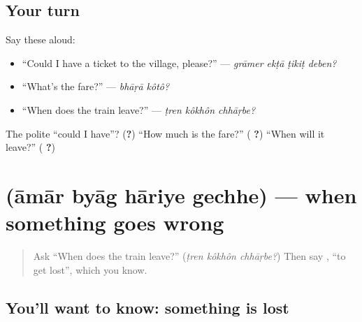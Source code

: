 \subsection*{Your turn}
Say these aloud:

\begin{itemize}
\raggedright
  \item \textquotedblleft{}Could I have a ticket to the village, please?\textquotedblright{} — \emph{grāmer ekṭā ṭikiṭ deben?}
  \item \textquotedblleft{}What's the fare?\textquotedblright{} — \emph{bhāṛā kôtô?}
  \item \textquotedblleft{}When does the train leave?\textquotedblright{} — \emph{ṭren kôkhôn chhāṛbe?}
\end{itemize}

\begin{tcolorbox}[breakable,colback=teal!4,colframe=teal!35!black,title={Before you move on}]
The polite \textquotedblleft{}could I have\textquotedblright{}? (\textbf{?}) \textquotedblleft{}How much is the fare?\textquotedblright{} (\textbf{ ?}) \textquotedblleft{}When will it leave?\textquotedblright{} (\textbf{ ?})
\end{tcolorbox}
\section[\texorpdfstring{\bn{আমার} \bn{ব্যাগ} \bn{হারিয়ে} … (āmār byāg hāriye …)}{আমার ব্যাগ হারিয়ে … (āmār byāg hāriye …)}]{    (āmār byāg hāriye gechhe) — when something goes wrong}

\label{lesson:BN-C271-hariye-gechhe}



\begin{quote}
Ask \textquotedblleft{}When does the train leave?\textquotedblright{} (\emph{ṭren kôkhôn chhāṛbe?}) Then say \textbf{ }, \textquotedblleft{}to get lost\textquotedblright{}, which you know.
\end{quote}

\subsection*{You'll want to know: something is lost}
\begin{quote}
\textbf{   }
\end{quote}

